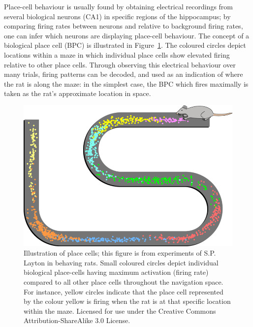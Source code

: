 Place-cell behaviour is usually found by obtaining electrical recordings from several biological neurons (CA1) in specific regions of the hippocampus; by comparing firing rates between neurons and relative to background firing rates, one can infer which neurons are displaying place-cell behaviour. The concept of a biological place cell (BPC) is illustrated in Figure~\ref{fig:Maze}.  The coloured circles depict locations within a maze in which individual place cells show elevated firing relative to other place cells.  Through observing this electrical behaviour over many trials, firing patterns can be decoded, and used as an indication of where the rat is along the maze: in the simplest case, the BPC which fires maximally is taken as the rat's approximate location in space. 

\begin{figure}[!t]
\centering
\includegraphics[width=.6\linewidth]{./gfx/Chapter01/bio_place_cells_rat.png}
\caption{Illustration of place cells; this figure is from experiments of S.P. Layton in behaving rats. Small coloured circles depict individual biological place-cells having maximum activation (firing rate) compared to all other place cells throughout the navigation space. For instance, yellow circles indicate that the place cell represented by the colour yellow is firing when the rat is at that specific location within the maze. Licensed for use under the Creative Commons Attribution\--Share\-A\-like 3.0 License.}
\label{fig:Maze}
\end{figure}

